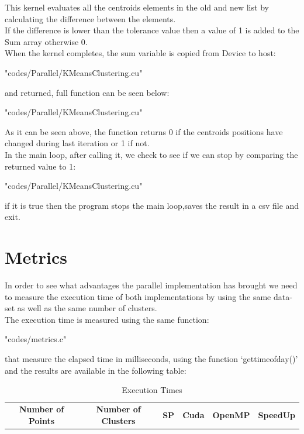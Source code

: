 \documentclass[10pt,twocolumn,letterpaper]{article}
\begin{document}
This kernel evaluates all the centroids elements in the old and new list by calculating the difference between the elements.\\
If the difference is lower than the tolerance value then a value of 1 is added to the Sum array otherwise 0.\\
When the kernel completes, the sum variable is copied from Device to host:\\
\begin{lstinputlisting}[language=C,style=CSnippetStyle,caption=CUDA Exit Condition Sum Copy,firstline=128,lastline=128]{
	"codes/Parallel/KMeansClustering.cu"}
\end{lstinputlisting}
and returned, full function can be seen below:\\
\begin{lstinputlisting}[language=C,style=CSnippetStyle,caption=CUDA Exit Condition Kernel Launcher,firstline=116,lastline=131]{
	"codes/Parallel/KMeansClustering.cu"}
\end{lstinputlisting}
As it can be seen above, the function returns 0 if the centroids positions have changed during last iteration or 1 if not.\\
In the main loop, after calling it, we check to see if we can stop by comparing the returned value to 1:\\
\begin{lstinputlisting}[language=C,style=CSnippetStyle,caption=CUDA Exit Condition,firstline=290,lastline=293]{
	"codes/Parallel/KMeansClustering.cu"}
\end{lstinputlisting}
if it is true then the program stops the main loop,saves the result in a csv file and exit.\\
\section{Metrics}
In order to see what advantages the parallel implementation has brought we need to measure the execution time of both implementations by
using the same data-set as well as the same number of clusters.\\
The execution time is measured using the same function:\\
\begin{lstinputlisting}[language=C,style=CSnippetStyle,caption=Time Function,firstline=1,lastline=13]{
	"codes/metrics.c"}
\end{lstinputlisting}
that measure the elapsed time in milliseconds, using the function `gettimeofday()' and the results are available in the following table:
\\
\begin{table}[H]
\centering
\begin{tabular}{@{}cccccc@{}}
\textbf{Number of Points} & \textbf{Number of Clusters} & \textbf{SP} & \textbf{Cuda} & \textbf{OpenMP} &  \textbf{SpeedUp} \\
\end{tabular}
\caption{Execution Times}

\end{table}
\end{document}
